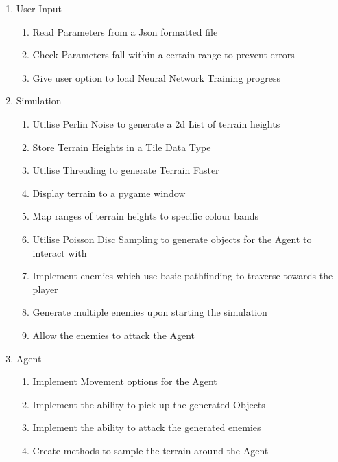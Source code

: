 \begin{flushleft}
\begin{enumerate}
            \begin{enumerate}
                \item User Input
                    \begin{enumerate}
                        \item Read Parameters from a Json formatted file
                        \item Check Parameters fall within a certain range to prevent errors
                        \item Give user option to load Neural Network Training progress
                    \end{enumerate}
                \item Simulation
                    \begin{enumerate}
                        \item Utilise Perlin Noise to generate a 2d List of terrain heights
                        \item Store Terrain Heights in a Tile Data Type
                        \item Utilise Threading to generate Terrain Faster
                        \item Display terrain to a pygame window
                        \item Map ranges of terrain heights to specific colour bands
                        \item Utilise Poisson Disc Sampling to generate objects for the Agent to interact with
                        \item Implement enemies which use basic pathfinding to traverse towards the player
                        \item Generate multiple enemies upon starting the simulation
                        \item Allow the enemies to attack the Agent
                    \end{enumerate}   
                \item Agent
                    \begin{enumerate}
                        \item Implement Movement options for the Agent
                        \item Implement the ability to pick up the generated Objects
                        \item Implement the ability to attack the generated enemies
                        \item Create methods to sample the terrain around the Agent

\end{enumerate}
\end{enumerate}
\end{enumerate}
\end{flushleft}
